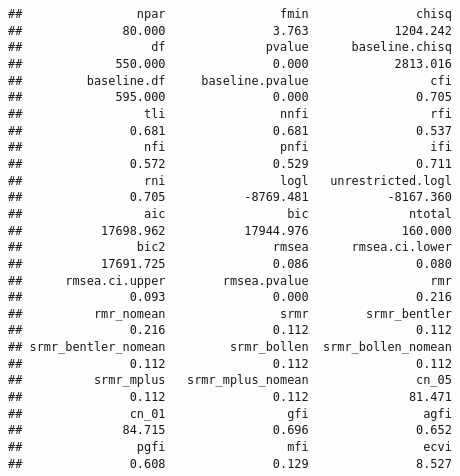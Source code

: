 \documentclass[english,man]{apa6}
\theoremstyle{definition}
\theoremstyle{definition}
\theoremstyle{definition}
\theoremstyle{remark}
\begin{document}
\begin{verbatim}
##                npar                fmin               chisq 
##              80.000               3.763            1204.242 
##                  df              pvalue      baseline.chisq 
##             550.000               0.000            2813.016 
##         baseline.df     baseline.pvalue                 cfi 
##             595.000               0.000               0.705 
##                 tli                nnfi                 rfi 
##               0.681               0.681               0.537 
##                 nfi                pnfi                 ifi 
##               0.572               0.529               0.711 
##                 rni                logl   unrestricted.logl 
##               0.705           -8769.481           -8167.360 
##                 aic                 bic              ntotal 
##           17698.962           17944.976             160.000 
##                bic2               rmsea      rmsea.ci.lower 
##           17691.725               0.086               0.080 
##      rmsea.ci.upper        rmsea.pvalue                 rmr 
##               0.093               0.000               0.216 
##          rmr_nomean                srmr        srmr_bentler 
##               0.216               0.112               0.112 
## srmr_bentler_nomean         srmr_bollen  srmr_bollen_nomean 
##               0.112               0.112               0.112 
##          srmr_mplus   srmr_mplus_nomean               cn_05 
##               0.112               0.112              81.471 
##               cn_01                 gfi                agfi 
##              84.715               0.696               0.652 
##                pgfi                 mfi                ecvi 
##               0.608               0.129               8.527
\end{verbatim}
\end{document}
